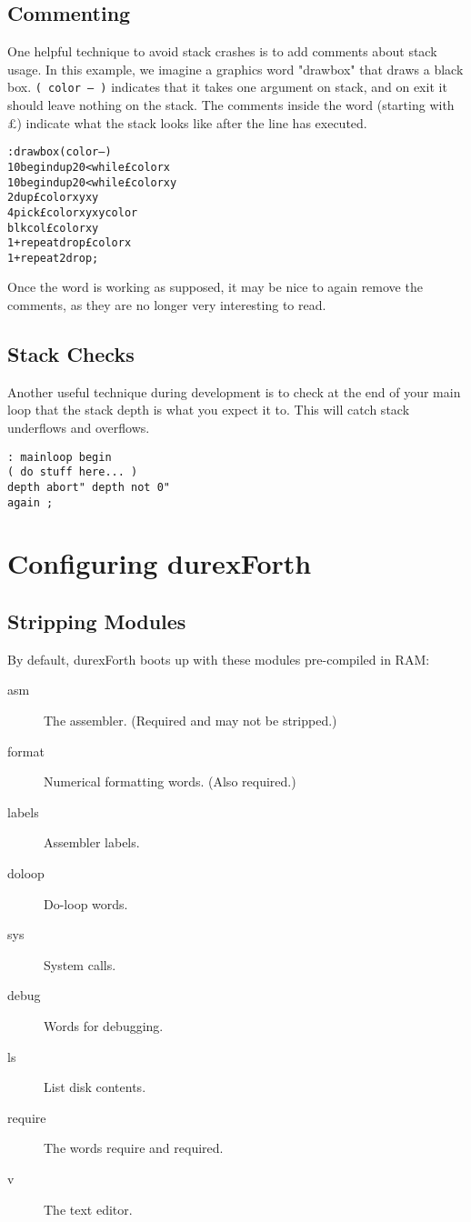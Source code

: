 \subsection{Commenting}

One helpful technique to avoid stack crashes is to add comments about stack usage.
In this example, we imagine a graphics word "drawbox" that draws a black box.
\texttt{( color -- )} indicates that it takes one argument on stack, and on exit it should
leave nothing on the stack. The comments inside the word (starting with \pounds) indicate what the stack
looks like after the line has executed.

\begin{alltt}
: drawbox ( color -- )
10 begin dup 20 < while \pounds color x
10 begin dup 20 < while \pounds color x y
2dup \pounds color x y x y
4 pick \pounds color x y x y color
blkcol \pounds color x y
1+ repeat drop \pounds color x
1+ repeat 2drop ;
\end{alltt}

Once the word is working as supposed, it may be nice to again remove the comments, as
they are no longer very interesting to read.

\subsection{Stack Checks}

Another useful technique during development is to check at the end of your main loop
that the stack depth is what you expect it to. This will catch stack underflows
and overflows.

\begin{verbatim}
: mainloop begin
( do stuff here... )
depth abort" depth not 0"
again ;
\end{verbatim}

\section{Configuring durexForth}

\subsection{Stripping Modules}

By default, durexForth boots up with these modules pre-compiled in RAM:

\begin{description}
    \item[asm] The assembler. (Required and may not be stripped.)
    \item[format] Numerical formatting words. (Also required.)
    \item[labels] Assembler labels.
    \item[doloop] Do-loop words.
    \item[sys] System calls.
    \item[debug] Words for debugging.
    \item[ls] List disk contents.
    \item[require] The words require and required.
    \item[v] The text editor.
\end{description}

